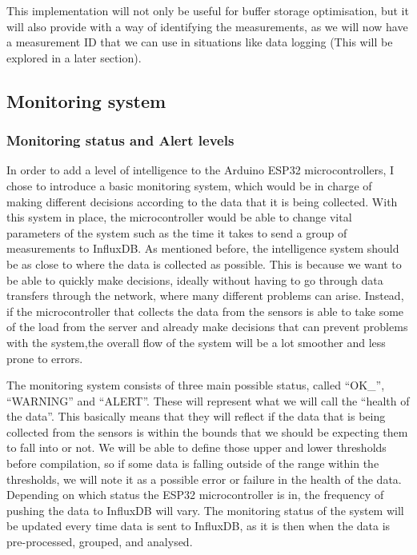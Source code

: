\documentclass[12pt]{article}
\begin{document}
This implementation will not only be useful for buffer storage optimisation, but it will also provide with a way of identifying the measurements, as we will now have a measurement ID that we can use in situations like data logging (This will be explored in a later section).

\subsection{Monitoring system}

\subsubsection{Monitoring status and Alert levels}

In order to add a level of intelligence to the Arduino ESP32 microcontrollers, I chose to introduce a basic monitoring system, which would be in charge of making different decisions according to the data that it is being collected. With this system in place, the microcontroller would be able to change vital parameters of the system such as the time it takes to send a group of measurements to InfluxDB. As mentioned before, the intelligence system should be as close to where the data is collected as possible. This is because we want to be able to quickly make decisions, ideally without having to go through data transfers through the network, where many different problems can arise. Instead, if the microcontroller that collects the data from the sensors is able to take some of the load from the server and already make decisions that can prevent problems with the system,the overall flow of the system will be a lot smoother and less prone to errors.\par

The monitoring system consists of three main possible status, called ``OK\_'', ``WARNING'' and ``ALERT''. These will represent what we will call the ``health of the data''. This basically means that they will reflect if the data that is being collected from the sensors is within the bounds that we should be expecting them to fall into or not. We will be able to define those upper and lower thresholds before compilation, so if some data is falling outside of the range within the thresholds, we will note it as a possible error or failure in the health of the data. Depending on which status the ESP32 microcontroller is in, the frequency of pushing the data to InfluxDB will vary. The monitoring status of the system will be updated every time data is sent to InfluxDB, as it is then when the data is pre-processed, grouped, and analysed.\par
\end{document}
